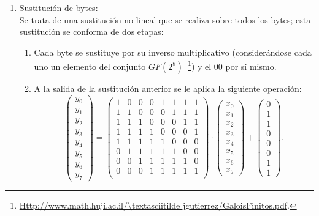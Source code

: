 \begin{enumerate}
  \item\label{sec:subBytes} Sustitución de bytes:\\
  
  Se trata de una sustitución no lineal que se realiza sobre todos los bytes; esta sustitución se conforma de dos etapas: 
  \begin{enumerate}
        \item Cada byte se sustituye por su inverso multiplicativo (considerándose cada uno un elemento del conjunto $GF(2^8)$~\footnote{\url{Http://www.math.huji.ac.il/\textasciitilde jgutierrez/GaloisFinitos.pdf}.})
        y el 00 por sí mismo.
        \item A la salida de la sustitución anterior se le aplica la siguiente operación:
            \[
            \begin{pmatrix}
            y_0 \\ y_1 \\ y_2 \\ y_3 \\ y_4 \\ y_5 \\ y_6 \\ y_7
            \end{pmatrix}
            =
            \begin{pmatrix}
            1 & 0 & 0 & 0 & 1 & 1 & 1 & 1 \\
            1 & 1 & 0 & 0 & 0 & 1 & 1 & 1 \\
            1 & 1 & 1 & 0 & 0 & 0 & 1 & 1 \\
            1 & 1 & 1 & 1 & 0 & 0 & 0 & 1 \\
            1 & 1 & 1 & 1 & 1 & 0 & 0 & 0 \\
            0 & 1 & 1 & 1 & 1 & 1 & 0 & 0 \\
            0 & 0 & 1 & 1 & 1 & 1 & 1 & 0 \\
            0 & 0 & 0 & 1 & 1 & 1 & 1 & 1 \\
            \end{pmatrix}
            \cdot
            \begin{pmatrix}
            x_0 \\ x_1 \\ x_2 \\ x_3 \\ x_4 \\ x_5 \\ x_6 \\ x_7
            \end{pmatrix}
            +
            \begin{pmatrix}
            0 \\ 1 \\ 1 \\ 0 \\ 0 \\ 0 \\ 1 \\ 1
            \end{pmatrix}.
            \]


\end{enumerate}
\end{enumerate}
